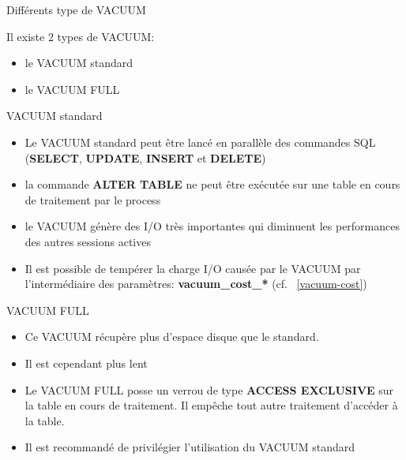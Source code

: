 
\begin{frame}{Différents type de VACUUM}

   Il existe 2 types de VACUUM:
   \begin{itemize}
      \item le VACUUM standard
      \item le VACUUM FULL 
   \end{itemize}

\end{frame}


\begin{frame}{VACUUM standard}

   \begin{itemize}
      \item Le VACUUM standard peut être lancé en parallèle des commandes SQL (\textbf{SELECT}, \textbf{UPDATE}, \textbf{INSERT} et \textbf{DELETE})
      \item la commande \textbf{ALTER TABLE} ne peut être exécutée sur une table en cours de traitement par le process
      \item le VACUUM génère des I/O très importantes qui diminuent les performances des autres sessions actives
      \item Il est possible de tempérer la charge I/O causée par le VACUUM par l'intermédiaire des paramètres: \textbf{vacuum\_cost\_*} (cf. ~\ref{vacuum-cost})
   \end{itemize}

\end{frame}


\begin{frame}{VACUUM FULL}

   \begin{itemize}
      \item Ce VACUUM récupère plus d'espace disque que le standard.
      \item Il est cependant plus lent
      \item Le VACUUM FULL posse un verrou de type \textbf{ACCESS EXCLUSIVE} sur la table en cours de traitement. Il empêche tout autre traitement d'accéder à la table.
      \item Il est recommandé de privilégier l'utilisation du VACUUM standard
   \end{itemize}

\end{frame}

